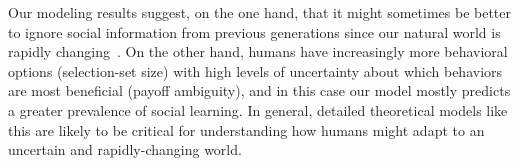 \documentclass[letterpaper,11.5pt]{scrartcl}
\newcommand{\mt}[1]{{\textcolor{myorange} {({\tiny MT:} #1)}}}
\newcommand{\cm}[1]{{\textcolor{mypurple} {({\tiny CM:} #1)}}}
\begin{document}
Our modeling results suggest, on the one hand, that it might sometimes be better to
ignore social information from previous generations since our natural world is
rapidly changing~\citep[e.g.,][]{IPCC2022}. On the other hand, humans have increasingly more behavioral options (selection-set size) with high levels of uncertainty about which behaviors are most beneficial (payoff ambiguity), and in this case our model mostly predicts a greater prevalence of social learning.
In general, detailed theoretical models like this are likely to be critical for understanding how humans might adapt to an uncertain and rapidly-changing world.
\end{document}
